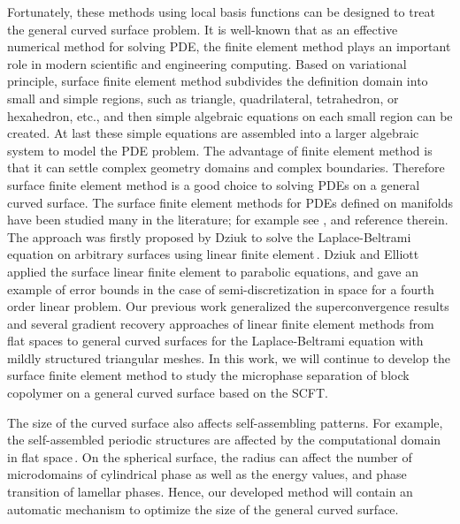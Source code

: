 \documentclass[final,1p,times]{elsarticle}
\begin{document}
Fortunately, these methods using local basis functions can be designed to treat
the general curved surface problem.  It is well-known that as an effective
numerical method for solving PDE, the finite element method plays an important
role in modern scientific and engineering computing.  Based on variational
principle, surface finite element method subdivides the definition domain into
small and simple regions, such as triangle, quadrilateral, tetrahedron,  or
hexahedron, etc., and then simple algebraic equations on each small region can
be created. At last these simple equations are assembled into a larger
algebraic system to model the PDE problem.  The advantage of finite element
method is that it can settle complex geometry domains and complex boundaries.
Therefore surface finite element method is a good choice to solving PDEs on a
general curved surface.  The surface finite element methods for PDEs defined on
manifolds have been studied many in the literature; for example see \cite{Dziuk1988,
    Dziuk;Elliott2007, wei2010, Dziuk1991, Dziuk2007, Demlow2009,
Dziuk;Elliott2013}, and reference therein.  The approach was firstly proposed
by Dziuk to solve the Laplace-Beltrami equation on arbitrary surfaces using
linear finite element\,\cite{Dziuk1988}.  Dziuk and Elliott
\cite{Dziuk;Elliott2007} applied the surface linear finite element to parabolic
equations, and gave an example of error bounds in the case of
semi-discretization in space for a fourth order linear problem.  Our previous
work \cite{wei2010} generalized the superconvergence results and several
gradient recovery approaches of linear finite element methods from flat spaces
to general curved surfaces for the Laplace-Beltrami equation with mildly
structured triangular meshes.  In this work, we will continue to develop the
surface finite element method to study the microphase separation of block
copolymer on a general curved surface based on the SCFT.


The size of the curved surface also affects self-assembling patterns.
For example, the self-assembled periodic structures are affected
by the computational domain in flat
space\,\cite{matsen1994stable}.  On the spherical surface, the
radius can affect the number of microdomains of cylindrical phase
as well as the energy values, and phase transition of lamellar
phases.  Hence, our developed method will contain an automatic
mechanism to optimize the size of the general curved surface.  


%
\end{document}
